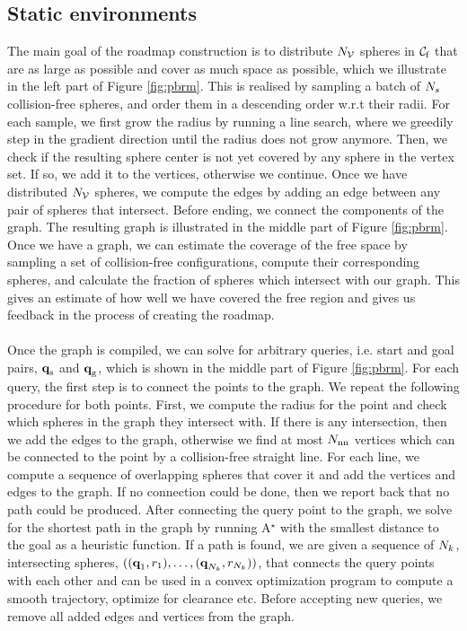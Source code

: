 \documentclass[../main.tex]{subfiles}
\begin{document}
\subsection{Static environments}
The main goal of the roadmap construction is to distribute $N_{\mathcal{V}}$ spheres in $\mathcal{C}_{\text{f}}$ that are as large as possible and cover as much space as possible, which we illustrate in the left part of Figure \ref{fig:pbrm}. This is realised by sampling a batch of $N_{s}$ collision-free spheres, and order them in a descending order w.r.t their radii. For each sample, we first grow the radius by running a line search, where we greedily step in the gradient direction until the radius does not grow anymore. Then, we check if the resulting sphere center is not yet covered by any sphere in the vertex set. If so, we add it to the vertices, otherwise we continue. Once we have distributed $N_{\mathcal{V}}$ spheres, we compute the edges by adding an edge between any pair of spheres that intersect. Before ending, we connect the components of the graph. The resulting graph is illustrated in the middle part of Figure \ref{fig:pbrm}. Once we have a graph, we can estimate the coverage of the free space by sampling a set of collision-free configurations, compute their corresponding spheres, and calculate the fraction of spheres which intersect with our graph. This gives an estimate of how well we have covered the free region and gives us feedback in the process of creating the roadmap.
\\\\
Once the graph is compiled, we can solve for arbitrary queries, i.e. start and goal pairs, $\textbf{q}_{\text{s}}$ and $\textbf{q}_{\text{g}}$, which is shown in the middle part of Figure \ref{fig:pbrm}. For each query, the first step is to connect the points to the graph. We repeat the following procedure for both points. First, we compute the radius for the point and check which spheres in the graph they intersect with. If there is any intersection, then we add the edges to the graph, otherwise we find at most $N_{\text{nn}}$ vertices which can be connected to the point by a collision-free straight line. For each line, we compute a sequence of overlapping spheres that cover it and add the vertices and edges to the graph. If no connection could be done, then we report back that no path could be produced. After connecting the query point to the graph, we solve for the shortest path in the graph by running A$^\star$ with the smallest distance to the goal as a heuristic function. If a path is found, we are given a sequence of $N_{k}$, intersecting spheres, $((\textbf{q}_1, r_1), \hdots, (\textbf{q}_{N_{k}}, r_{N_{k}}))$, that connects the query points with each other and can be used in a convex optimization program to compute a smooth trajectory, optimize for clearance etc. Before accepting new queries, we remove all added edges and vertices from the graph.
\end{document}
